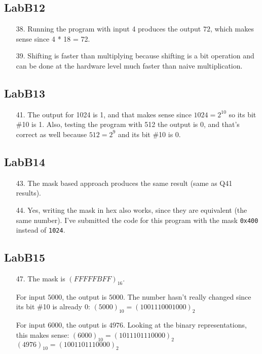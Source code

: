 \documentclass{article}
\begin{document}
\subsection{LabB12}
\begin{enumerate}
\item[38. ] Running the program with input 4 produces the output $72$, which makes sense since 4 * 18 = 72.

\item[39. ] Shifting is faster than multiplying because shifting is a bit operation and can be done at the hardware level much faster than naive multiplication.
\end{enumerate}

\subsection{LabB13}
\begin{enumerate}
\item[41. ] The output for 1024 is 1, and that makes sense since $1024 = 2^{10}$ so its bit \#10 is 1. Also, testing the program with 512 the output is 0, and that's correct as well because $512 = 2^9$ and its bit \#10 is 0.
\end{enumerate}

\subsection{LabB14}
\begin{enumerate}
\item[43. ] The mask based approach produces the same result (same as Q41 results).

\item[44. ] Yes, writing the mask in hex also works, since they are equivalent (the same number). I've submitted the code for this program with the mask \verb$0x400$ instead of \verb$1024$.
\end{enumerate}

\subsection{LabB15}
\begin{enumerate}
\item[47. ] The mask is $(FFFFFBFF)_{16}$.\newline

For input $5000$, the output is $5000$. The number hasn't really changed since its bit \#10 is already 0:
$(5000)_{10} = (1001110001000)_2$ \newline

For input $6000$, the output is $4976$. Looking at the binary representations, this makes sense:\newline
$(6000)_{10} = (1011101110000)_2$ \newline
$(4976)_{10} = (1001101110000)_2$ \newline
\end{enumerate}
\end{document}
